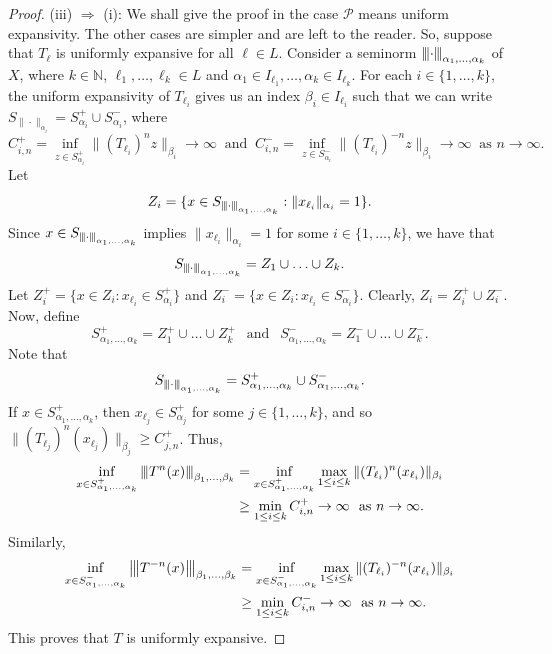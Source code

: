 \documentclass[12pt]{amsart}
\theoremstyle{theorem}
\theoremstyle{definition}
\theoremstyle{remark} \theoremstyle{question} \theoremstyle{example}
\newcommand{\N}{\mathbb{N}}   %
\newcommand{\cP}{\mathcal{P}}
\newcommand{\vertiii}[1]{{\left\vert\kern-0.25ex\left\vert\kern-0.25ex\left\vert #1 
    \right\vert\kern-0.25ex\right\vert\kern-0.25ex\right\vert}}
\begin{document}
\begin{proof}
\smallskip\noindent
(iii) $\Rightarrow$ (i): We shall give the proof in the case $\cP$ means uniform expansivity. 
The other cases are simpler and are left to the reader. So, suppose that $T_\ell$ is uniformly expansive for all $\ell \in L$.
Consider a seminorm $\vertiii{\cdot}_{\alpha_1,\ldots,\alpha_k}$ of $X$, where
$k \in \N$, $\ell_1,\ldots,\ell_k \in L$ and $\alpha_1 \in I_{\ell_1},\ldots,\alpha_k \in I_{\ell_k}$.
For each $i \in \{1,\ldots,k\}$, the uniform expansivity of $T_{\ell_i}$ gives us an index $\beta_i \in I_{\ell_i}$ such that 
we can write $S_{\|\cdot\|_{\alpha_i}} = S^{+}_{\alpha_i} \cup S^{-}_{\alpha_i}$, where
\[
C^{+}_{i,n} = \inf_{z \in S^{+}_{\alpha_i}} \|(T_{\ell_i})^n z\|_{\beta_i} \to \infty \ \text{ and } \ 
C^{-}_{i,n} = \inf_{z \in S^{-}_{\alpha_i}} \|(T_{\ell_i})^{-n} z\|_{\beta_i} \to \infty \ \text{ as } n \to \infty.
\]
Let
\[
Z_i = \{x \in S_{\vertiii{\cdot}_{\alpha_1,\ldots,\alpha_k}} : \|x_{\ell_i}\|_{\alpha_i} = 1\}.
\]
Since $x \in S_{\vertiii{\cdot}_{\alpha_1,\ldots,\alpha_k}}$ implies $\|x_{\ell_i}\|_{\alpha_i} = 1$ for some $i \in \{1,\ldots,k\}$, we have that
\[
S_{\vertiii{\cdot}_{\alpha_1,\ldots,\alpha_k}} = Z_1 \cup \ldots \cup Z_k.
\]
Let $Z_i^+ = \{x \in Z_i : x_{\ell_i} \in S^{+}_{\alpha_i}\}$ and $Z_i^- = \{x \in Z_i : x_{\ell_i} \in S^{-}_{\alpha_i}\}$.
Clearly, $Z_i = Z_i^+ \cup Z_i^-$. Now, define
\[
S^{+}_{\alpha_1,\ldots,\alpha_k} = Z_1^+ \cup \ldots \cup Z_k^+ \ \ \text{ and } \ \
S^{-}_{\alpha_1,\ldots,\alpha_k} = Z_1^- \cup \ldots \cup Z_k^-.
\]
Note that
\[
S_{\vertiii{\cdot}_{\alpha_1,\ldots,\alpha_k}} = S^{+}_{\alpha_1,\ldots,\alpha_k} \cup S^{-}_{\alpha_1,\ldots,\alpha_k}.
\]
If $x \in S^{+}_{\alpha_1,\ldots,\alpha_k}$, then $x_{\ell_j} \in S^{+}_{\alpha_j}$ for some $j \in \{1,\ldots,k\}$, 
and so $\|(T_{\ell_j})^n(x_{\ell_j})\|_{\beta_j} \geq C^{+}_{j,n}$. Thus,
\begin{align*}
\inf_{x \in S^{+}_{\alpha_1,\ldots,\alpha_k}} \vertiii{T^n(x)}_{\beta_1,\ldots,\beta_k}
  &= \inf_{x \in S^{+}_{\alpha_1,\ldots,\alpha_k}} \max_{1 \leq i \leq k} \|(T_{\ell_i})^n(x_{\ell_i})\|_{\beta_i}\\
  &\geq \min_{1 \leq i \leq k} C^{+}_{i,n} \to \infty \ \text{ as } n \to \infty.
\end{align*}
Similarly,
\begin{align*}
\inf_{x \in S^{-}_{\alpha_1,\ldots,\alpha_k}} \vertiii{T^{-n}(x)}_{\beta_1,\ldots,\beta_k}
  &= \inf_{x \in S^{-}_{\alpha_1,\ldots,\alpha_k}} \max_{1 \leq i \leq k} \|(T_{\ell_i})^{-n}(x_{\ell_i})\|_{\beta_i}\\
  &\geq \min_{1 \leq i \leq k} C^{-}_{i,n} \to \infty \ \text{ as } n \to \infty.
\end{align*}
This proves that $T$ is uniformly expansive.
\end{proof}
\end{document}
